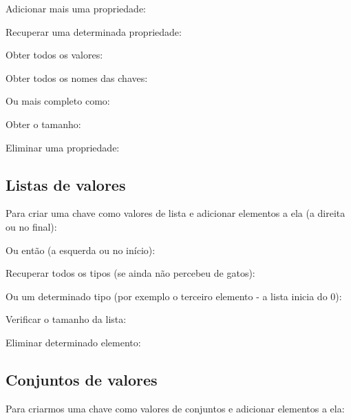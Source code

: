 Adicionar mais uma propriedade: \\

Recuperar uma determinada propriedade: \\

Obter todos os valores: \\

Obter todos os nomes das chaves: \\

Ou mais completo como: \\

Obter o tamanho: \\

Eliminar uma propriedade: \\

\subsection{Listas de valores}
Para criar uma chave como valores de lista e adicionar elementos a ela (a direita ou no final): \\

Ou então (a esquerda ou no início): \\

Recuperar todos os tipos (se ainda não percebeu de gatos): \\

Ou um determinado tipo (por exemplo o terceiro elemento - a lista inicia do 0): \\

Verificar o tamanho da lista: \\

Eliminar determinado elemento: \\

\subsection{Conjuntos de valores}
Para criarmos uma chave como valores de conjuntos e adicionar elementos a ela: \\

